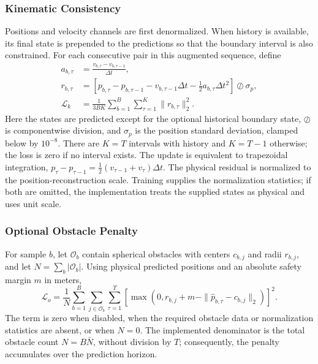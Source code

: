 \documentclass[12pt]{article}
\begin{document}
\subsubsection{Kinematic Consistency}
Positions and velocity channels are first denormalized. When history is
available, its final state is prepended to the predictions so that the boundary
interval is also constrained. For each consecutive pair in this augmented
sequence, define
\begin{align}
 a_{b,\tau} &= \frac{v_{b,\tau}-v_{b,\tau-1}}{\Delta t}, \\
 r_{b,\tau} &= \left[p_{b,\tau}-p_{b,\tau-1}
 -v_{b,\tau-1}\Delta t-\tfrac12 a_{b,\tau}\Delta t^2\right]
 \oslash\sigma_p, \\
\mathcal{L}_{k} &= \frac{1}{3BK}\sum_{b=1}^{B}\sum_{\tau=1}^{K}
 \|r_{b,\tau}\|_2^2.
\end{align}
Here the states are predicted except for the optional historical boundary
state, $\oslash$ is componentwise division, and $\sigma_p$ is the position
standard deviation, clamped below by $10^{-8}$. There are $K=T$ intervals
with history and $K=T-1$ otherwise; the loss is zero if no interval exists.
The update is equivalent to trapezoidal integration,
$p_{\tau}-p_{\tau-1}=\tfrac12(v_{\tau-1}+v_{\tau})\Delta t$.
The physical residual is normalized to the position-reconstruction scale.
Training supplies the normalization statistics; if both are omitted, the
implementation treats the supplied states as physical and uses unit scale.

\subsubsection{Optional Obstacle Penalty}
For sample $b$, let $\mathcal{O}_b$ contain spherical obstacles with centers
$c_{b,j}$ and radii $r_{b,j}$, and let $N=\sum_b|\mathcal{O}_b|$. Using
physical predicted positions and an absolute safety margin $m$ in meters,
\begin{equation}
\mathcal{L}_{o}=\frac{1}{N}\sum_{b=1}^{B}\sum_{j\in\mathcal{O}_b}
 \sum_{\tau=1}^{T}
 \left[\max\left(0,r_{b,j}+m-\|\hat p_{b,\tau}-c_{b,j}\|_2\right)\right]^2.
\end{equation}
The term is zero when disabled, when the required obstacle data or normalization
statistics are absent, or when $N=0$. The implemented denominator is the total
obstacle count $N=B\bar N$, without division by $T$; consequently, the penalty
accumulates over the prediction horizon.
\end{document}
